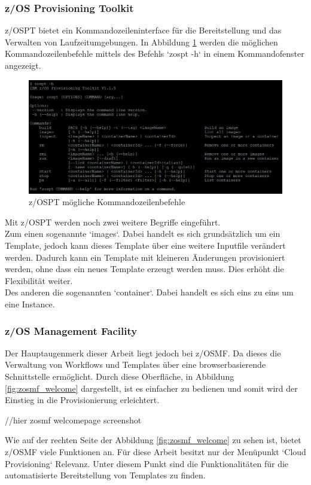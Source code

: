 \subsubsection{z/OS Provisioning Toolkit}
z/OSPT bietet ein Kommandozeileninterface für die Bereitstellung und das Verwalten von Laufzeitumgebungen.
In Abbildung \ref{fig:zospt_help} werden die möglichen Kommandozeilenbefehle mittels des Befehls `zospt -h` in einem Kommandofenster angezeigt.
\begin{figure}[h]
	\centering
	\includegraphics[width=\textwidth]{figures/zospt_help_putty.png}
	\caption{z/OSPT mögliche Kommandozeilenbefehle}
	\label{fig:zospt_help}
\end{figure}
Mit z/OSPT werden noch zwei weitere Begriffe eingeführt.\\
Zum einen sogenannte `images`.
Dabei handelt es sich grundsätzlich um ein Template, jedoch kann dieses Template über eine weitere Inputfile verändert werden.
Dadurch kann ein Template mit kleineren Änderungen provisioniert werden, ohne dass ein neues Template erzeugt werden muss.
Dies erhöht die Flexibilität weiter.\\
Des anderen die sogenannten `container`.
Dabei handelt es sich eins zu eins um eine Instance.
\cite{IBM.2019b}

\subsubsection{z/OS Management Facility}\label{sssec:zosmf}
Der Hauptaugenmerk dieser Arbeit liegt jedoch bei z/OSMF.
Da dieses die Verwaltung von Workflows und Templates über eine browserbasierende Schnittstelle ermöglicht.
Durch diese Oberfläche, in Abbildung \ref{fig:zosmf_welcome} dargestellt, ist es einfacher zu bedienen und somit wird der Einstieg in die Provisionierung erleichtert.

//hier zosmf welcomepage screenshot

Wie auf der rechten Seite der Abbildung \ref{fig:zosmf_welcome} zu sehen ist, bietet z/OSMF viele Funktionen an.
Für diese Arbeit besitzt nur der Menüpunkt `Cloud Provisioning` Relevanz.
Unter diesem Punkt sind die Funktionalitäten für die automatisierte Bereitstellung von Templates zu finden.
\cite{Rotthove.2018}

